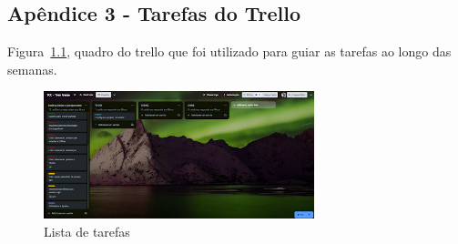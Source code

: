 \begin{apendicesenv}
\chapter{Apêndice 3 - Tarefas do Trello}

Figura~\ref{fig:trello-tarefas}, quadro do trello que foi utilizado para guiar as tarefas ao longo das semanas.

\begin{figure}[htbp]
    \centering
    \caption{Lista de tarefas}
    \label{fig:trello-tarefas}
    \includegraphics[width=0.7\textwidth]{figuras/trello-quadro.png}
\end{figure}


\end{apendicesenv}
